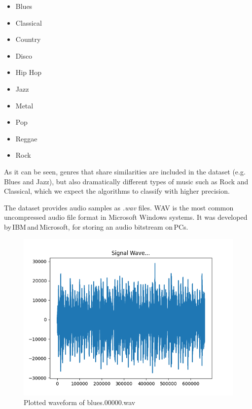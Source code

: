 \documentclass[12pt]{article}
\begin{document}
	\begin{itemize}
		\item Blues 
		\item Classical 
		\item Country 
		\item Disco 
		\item Hip Hop 	
		\item Jazz 
		\item Metal 
		\item Pop 
		\item Reggae 
		\item Rock 
	\end{itemize}

	As it can be seen, genres that share similarities are included in the dataset (e.g. Blues and Jazz), but also dramatically different types of music such as Rock and Classical, which we expect the algorithms to classify with higher precision.
	
	The dataset provides audio samples as \textit{.wav} files. WAV is the most common uncompressed audio file format in Microsoft Windows systems. It was developed by IBM and Microsoft, for storing an audio bitstream on PCs\cite{wave}.\\
	
	\begin{figure}[H]
		\hspace{100pt}\includegraphics[scale=0.7]{waveform}
		\caption{Plotted waveform of blues.00000.wav}
	\end{figure}
	
\end{document}
